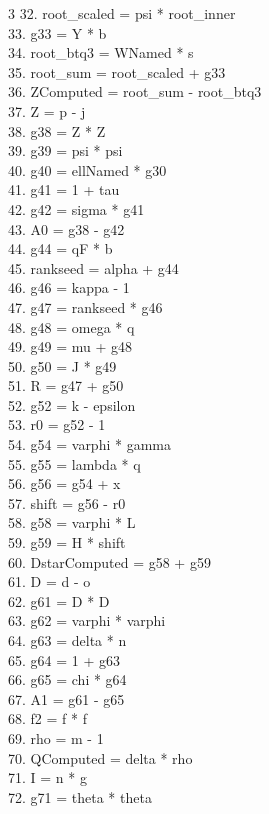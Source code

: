 \documentclass[10pt]{article}
\begin{document}
\begin{multicols}{3}
32. root\_scaled = psi * root\_inner\\
33. g33 = Y * b\\
34. root\_btq3 = WNamed * s\\
35. root\_sum = root\_scaled + g33\\
36. ZComputed = root\_sum - root\_btq3\\
37. Z = p - j\\
38. g38 = Z * Z\\
39. g39 = psi * psi\\
40. g40 = ellNamed * g30\\
41. g41 = 1 + tau\\
42. g42 = sigma * g41\\
43. A0 = g38 - g42\\
44. g44 = qF * b\\
45. rankseed = alpha + g44\\
46. g46 = kappa - 1\\
47. g47 = rankseed * g46\\
48. g48 = omega * q\\
49. g49 = mu + g48\\
50. g50 = J * g49\\
51. R = g47 + g50\\
52. g52 = k - epsilon\\
53. r0 = g52 - 1\\
54. g54 = varphi * gamma\\
55. g55 = lambda * q\\
56. g56 = g54 + x\\
57. shift = g56 - r0\\
58. g58 = varphi * L\\
59. g59 = H * shift\\
60. DstarComputed = g58 + g59\\
61. D = d - o\\
62. g61 = D * D\\
63. g62 = varphi * varphi\\
64. g63 = delta * n\\
65. g64 = 1 + g63\\
66. g65 = chi * g64\\
67. A1 = g61 - g65\\
68. f2 = f * f\\
69. rho = m - 1\\
70. QComputed = delta * rho\\
71. I = n * g\\
72. g71 = theta * theta\\

\end{multicols}
\end{document}
